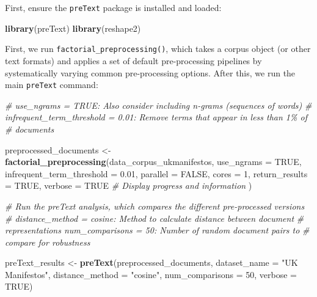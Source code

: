 \documentclass[
]{book}
\newenvironment{Shaded}{\begin{snugshade}}{\end{snugshade}}
\newcommand{\AttributeTok}[1]{\textcolor[rgb]{0.13,0.29,0.53}{#1}}
\newcommand{\CommentTok}[1]{\textcolor[rgb]{0.56,0.35,0.01}{\textit{#1}}}
\newcommand{\ConstantTok}[1]{\textcolor[rgb]{0.56,0.35,0.01}{#1}}
\newcommand{\DecValTok}[1]{\textcolor[rgb]{0.00,0.00,0.81}{#1}}
\newcommand{\FloatTok}[1]{\textcolor[rgb]{0.00,0.00,0.81}{#1}}
\newcommand{\FunctionTok}[1]{\textcolor[rgb]{0.13,0.29,0.53}{\textbf{#1}}}
\newcommand{\NormalTok}[1]{#1}
\newcommand{\OtherTok}[1]{\textcolor[rgb]{0.56,0.35,0.01}{#1}}
\newcommand{\StringTok}[1]{\textcolor[rgb]{0.31,0.60,0.02}{#1}}
\begin{document}
First, ensure the \texttt{preText} package is installed and loaded:

\begin{Shaded}
\begin{Highlighting}[]
\FunctionTok{library}\NormalTok{(preText)}
\FunctionTok{library}\NormalTok{(reshape2)}
\end{Highlighting}
\end{Shaded}

First, we run \texttt{factorial\_preprocessing()}, which takes a corpus object (or other text formats) and applies a set of default pre-processing pipelines by systematically varying common pre-processing options. After this, we run the main \texttt{preText} command:

\begin{Shaded}
\begin{Highlighting}[]
\CommentTok{\# use\_ngrams = TRUE: Also consider including n{-}grams (sequences of words)}
\CommentTok{\# infrequent\_term\_threshold = 0.01: Remove terms that appear in less than 1\% of}
\CommentTok{\# documents}

\NormalTok{preprocessed\_documents }\OtherTok{\textless{}{-}} \FunctionTok{factorial\_preprocessing}\NormalTok{(data\_corpus\_ukmanifestos, }\AttributeTok{use\_ngrams =} \ConstantTok{TRUE}\NormalTok{,}
    \AttributeTok{infrequent\_term\_threshold =} \FloatTok{0.01}\NormalTok{, }\AttributeTok{parallel =} \ConstantTok{FALSE}\NormalTok{, }\AttributeTok{cores =} \DecValTok{1}\NormalTok{, }\AttributeTok{return\_results =} \ConstantTok{TRUE}\NormalTok{,}
    \AttributeTok{verbose =} \ConstantTok{TRUE}  \CommentTok{\# Display progress and information}
\NormalTok{)}

\CommentTok{\# Run the preText analysis, which compares the different pre{-}processed versions}
\CommentTok{\# distance\_method = \textquotesingle{}cosine\textquotesingle{}: Method to calculate distance between document}
\CommentTok{\# representations num\_comparisons = 50: Number of random document pairs to}
\CommentTok{\# compare for robustness}

\NormalTok{preText\_results }\OtherTok{\textless{}{-}} \FunctionTok{preText}\NormalTok{(preprocessed\_documents, }\AttributeTok{dataset\_name =} \StringTok{"UK Manifestos"}\NormalTok{,}
    \AttributeTok{distance\_method =} \StringTok{"cosine"}\NormalTok{, }\AttributeTok{num\_comparisons =} \DecValTok{50}\NormalTok{, }\AttributeTok{verbose =} \ConstantTok{TRUE}\NormalTok{)}
\end{Highlighting}
\end{Shaded}
\end{document}
